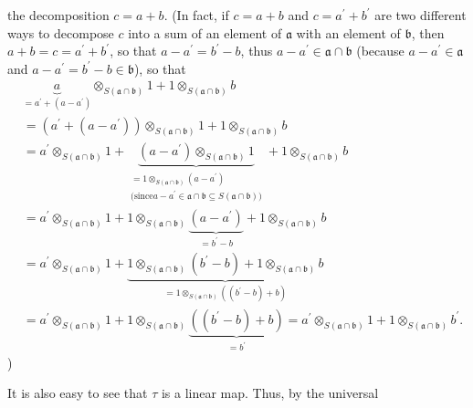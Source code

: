 \documentclass[etingof-lie.tex]{subfiles}
\begin{document}
{the decomposition $c=a+b$. (In fact, if $c=a+b$ and $c=a^{\prime}+b^{\prime}$
are two different ways to decompose $c$ into a sum of an element of
$\mathfrak{a}$ with an element of $\mathfrak{b}$, then $a+b=c=a^{\prime
}+b^{\prime}$, so that $a-a^{\prime}=b^{\prime}-b$, thus $a-a^{\prime}%
\in\mathfrak{a}\cap\mathfrak{b}$ (because $a-a^{\prime}\in\mathfrak{a}$ and
$a-a^{\prime}=b^{\prime}-b\in\mathfrak{b}$), so that%
\begin{align*}
&  \underbrace{a}_{=a^{\prime}+\left(  a-a^{\prime}\right)  }\otimes_{S\left(
\mathfrak{a}\cap\mathfrak{b}\right)  }1+1\otimes_{S\left(  \mathfrak{a}%
\cap\mathfrak{b}\right)  }b\\
&  =\left(  a^{\prime}+\left(  a-a^{\prime}\right)  \right)  \otimes_{S\left(
\mathfrak{a}\cap\mathfrak{b}\right)  }1+1\otimes_{S\left(  \mathfrak{a}%
\cap\mathfrak{b}\right)  }b\\
&  =a^{\prime}\otimes_{S\left(  \mathfrak{a}\cap\mathfrak{b}\right)
}1+\underbrace{\left(  a-a^{\prime}\right)  \otimes_{S\left(  \mathfrak{a}%
\cap\mathfrak{b}\right)  }1}_{\substack{=1\otimes_{S\left(  \mathfrak{a}%
\cap\mathfrak{b}\right)  }\left(  a-a^{\prime}\right)  \\\text{(since
}a-a^{\prime}\in\mathfrak{a}\cap\mathfrak{b}\subseteq S\left(  \mathfrak{a}%
\cap\mathfrak{b}\right)  \text{)}}}+1\otimes_{S\left(  \mathfrak{a}%
\cap\mathfrak{b}\right)  }b\\
&  =a^{\prime}\otimes_{S\left(  \mathfrak{a}\cap\mathfrak{b}\right)
}1+1\otimes_{S\left(  \mathfrak{a}\cap\mathfrak{b}\right)  }%
\underbrace{\left(  a-a^{\prime}\right)  }_{=b^{\prime}-b}+1\otimes_{S\left(
\mathfrak{a}\cap\mathfrak{b}\right)  }b\\
&  =a^{\prime}\otimes_{S\left(  \mathfrak{a}\cap\mathfrak{b}\right)
}1+\underbrace{1\otimes_{S\left(  \mathfrak{a}\cap\mathfrak{b}\right)
}\left(  b^{\prime}-b\right)  +1\otimes_{S\left(  \mathfrak{a}\cap
\mathfrak{b}\right)  }b}_{=1\otimes_{S\left(  \mathfrak{a}\cap\mathfrak{b}%
\right)  }\left(  \left(  b^{\prime}-b\right)  +b\right)  }\\
&  =a^{\prime}\otimes_{S\left(  \mathfrak{a}\cap\mathfrak{b}\right)
}1+1\otimes_{S\left(  \mathfrak{a}\cap\mathfrak{b}\right)  }%
\underbrace{\left(  \left(  b^{\prime}-b\right)  +b\right)  }_{=b^{\prime}%
}=a^{\prime}\otimes_{S\left(  \mathfrak{a}\cap\mathfrak{b}\right)  }%
1+1\otimes_{S\left(  \mathfrak{a}\cap\mathfrak{b}\right)  }b^{\prime}.
\end{align*}
)
\par
It is also easy to see that $\tau$ is a linear map. Thus, by the universal
}
\end{document}
